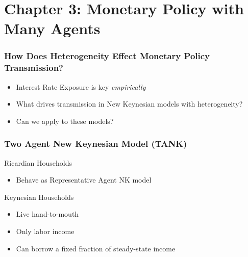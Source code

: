 \documentclass{beamer}
\begin{document}
\section{Chapter 3: Monetary Policy with Many Agents}
\frame
{
	\frametitle{How Does Heterogeneity Effect Monetary Policy Transmission?}
		\setlength{\leftmargini}{2.5cm}
	\begin{itemize}
		\item<1->[Chapter 2]{Interest Rate Exposure is key \textit{empirically}}
		\item<2->[This Chapter]{What drives transmission in New Keynesian models with heterogeneity?}
		\item<2->[]{Can we apply \cite{auclert_monetary_2017} to these models?}
	\end{itemize}
}
\frame
{
	\frametitle{Two Agent New Keynesian Model (TANK)}
	Ricardian Households
	\begin{itemize}
		\item Behave as Representative Agent NK model
	\end{itemize}
	Keynesian Households
	\begin{itemize}
	\item Live hand-to-mouth
	\item Only labor income
	\item Can borrow a fixed fraction of steady-state income
	\end{itemize}
}
\end{document}
